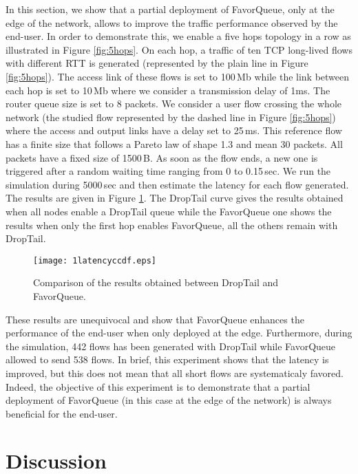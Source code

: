 \documentclass{elsart}
\begin{document}
In this section, we show that a partial deployment of FavorQueue, only at the edge of the network, allows to improve the traffic performance observed by the end-user. In order to demonstrate this, we enable a five hops topology in a row as illustrated in Figure \ref{fig:5hops}. On each hop, a traffic of ten TCP long-lived flows with different RTT is generated (represented by the plain line in Figure \ref{fig:5hops}). The access link of these flows is set to 100\,Mb while the link between each hop is set to 10\,Mb where we consider a transmission delay of 1ms. The router queue size is set to 8 packets. We consider a user flow crossing the whole network (the studied flow represented by the dashed line in Figure \ref{fig:5hops}) where the access and output links have a delay set to 25\,ms. This reference flow has a finite size that follows a Pareto law of shape 1.3 and mean 30 packets. All packets have a fixed size of 1500\,B. As soon as the flow ends, a new one is triggered after a random waiting time ranging from 0 to 0.15\,sec. We run the simulation during 5000\,sec and then estimate the latency for each flow generated.
The results are given in Figure \ref{fig:5hops_results}. The DropTail curve gives the results obtained when all nodes enable a DropTail queue while the FavorQueue one shows the results when only the first hop enables FavorQueue, all the others remain with DropTail.

\begin{figure}[htb!]
   	\centering
\texttt{[image: 1latencyccdf.eps]}
	\caption{Comparison of the results obtained between DropTail and FavorQueue.}
	\label{fig:5hops_results}
\end{figure}

These results are unequivocal and show that FavorQueue enhances the performance of the end-user when only deployed at the edge. Furthermore, during the simulation, 442 flows has been generated with DropTail while FavorQueue allowed to send 538 flows. In brief, this experiment shows that the latency is improved, but this does not mean that all short flows are systematicaly favored. Indeed, the objective of this experiment is to demonstrate that a partial deployment of FavorQueue (in this case at the edge of the network) is always beneficial for the end-user. 

\section{Discussion}
\label{sec:discuss}
\end{document}

